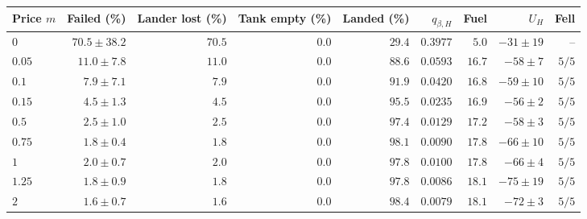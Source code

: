 \begin{tabular}{lrrrrrrrr}
\toprule
Price $m$ & Failed (\%) & Lander lost (\%) & Tank empty (\%) & Landed (\%) & $q_{\beta,H}$ & Fuel & $U_H$ & Fell \\
\midrule
$0$ & $70.5\pm38.2$ & $70.5$ & $0.0$ & $29.4$ & $0.3977$ & $5.0$ & $-31\pm19$ & -- \\
$0.05$ & $11.0\pm7.8$ & $11.0$ & $0.0$ & $88.6$ & $0.0593$ & $16.7$ & $-58\pm7$ & $5/5$ \\
$0.1$ & $7.9\pm7.1$ & $7.9$ & $0.0$ & $91.9$ & $0.0420$ & $16.8$ & $-59\pm10$ & $5/5$ \\
$0.15$ & $4.5\pm1.3$ & $4.5$ & $0.0$ & $95.5$ & $0.0235$ & $16.9$ & $-56\pm2$ & $5/5$ \\
$0.5$ & $2.5\pm1.0$ & $2.5$ & $0.0$ & $97.4$ & $0.0129$ & $17.2$ & $-58\pm3$ & $5/5$ \\
$0.75$ & $1.8\pm0.4$ & $1.8$ & $0.0$ & $98.1$ & $0.0090$ & $17.8$ & $-66\pm10$ & $5/5$ \\
$1$ & $2.0\pm0.7$ & $2.0$ & $0.0$ & $97.8$ & $0.0100$ & $17.8$ & $-66\pm4$ & $5/5$ \\
$1.25$ & $1.8\pm0.9$ & $1.8$ & $0.0$ & $97.8$ & $0.0086$ & $18.1$ & $-75\pm19$ & $5/5$ \\
$2$ & $1.6\pm0.7$ & $1.6$ & $0.0$ & $98.4$ & $0.0079$ & $18.1$ & $-72\pm3$ & $5/5$ \\
\bottomrule
\end{tabular}
